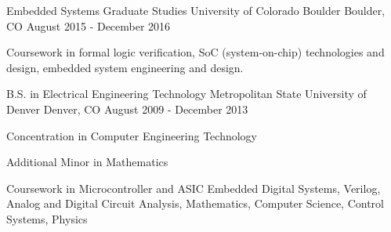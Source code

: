 

\begin{cventries}

  \cventry
    {Embedded Systems Graduate Studies} %
    {University of Colorado Boulder} %
    {Boulder, CO} %
    {August 2015 - December 2016} %
    {
      \begin{cvitems} %
		\item {Coursework in formal logic verification, SoC (system-on-chip) technologies and design, embedded system engineering and design.}
      \end{cvitems}
    }
  \cventry
    {B.S. in Electrical Engineering Technology} %
    {Metropolitan State University of Denver} %
    {Denver, CO} %
    {August 2009 - December 2013} %
    {
      \begin{cvitems} %
		\item {Concentration in Computer Engineering Technology}
		\item { Additional Minor in Mathematics }
		\item { Coursework in Microcontroller and ASIC Embedded Digital Systems, Verilog, Analog and Digital Circuit Analysis, Mathematics, Computer \linebreak Science, Control Systems, Physics }
      \end{cvitems}
    }

\end{cventries}
